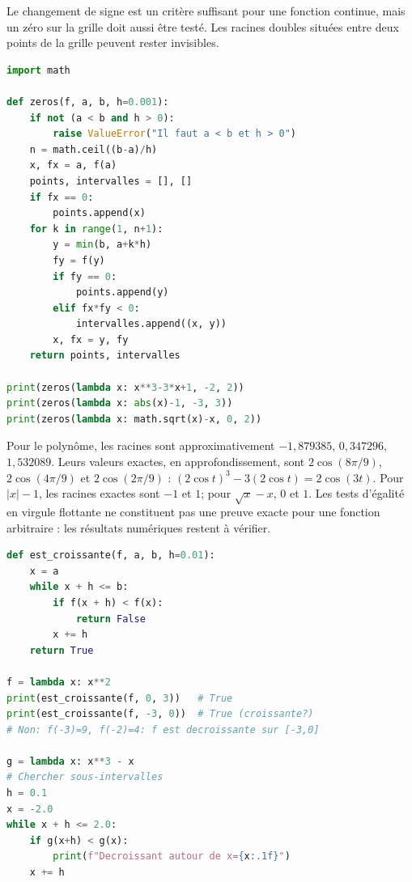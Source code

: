 Le changement de signe est un crit\`ere suffisant pour une fonction continue,
mais un z\'ero sur la grille doit aussi \^etre test\'e. Les racines doubles
situ\'ees entre deux points de la grille peuvent rester invisibles.
\begin{lstlisting}[language=Python]
import math

def zeros(f, a, b, h=0.001):
    if not (a < b and h > 0):
        raise ValueError("Il faut a < b et h > 0")
    n = math.ceil((b-a)/h)
    x, fx = a, f(a)
    points, intervalles = [], []
    if fx == 0:
        points.append(x)
    for k in range(1, n+1):
        y = min(b, a+k*h)
        fy = f(y)
        if fy == 0:
            points.append(y)
        elif fx*fy < 0:
            intervalles.append((x, y))
        x, fx = y, fy
    return points, intervalles

print(zeros(lambda x: x**3-3*x+1, -2, 2))
print(zeros(lambda x: abs(x)-1, -3, 3))
print(zeros(lambda x: math.sqrt(x)-x, 0, 2))
\end{lstlisting}
Pour le polyn\^ome, les racines sont approximativement
$-1{,}879385$, $0{,}347296$, $1{,}532089$.
Leurs valeurs exactes, en approfondissement, sont
$2\cos(8\pi/9)$, $2\cos(4\pi/9)$ et $2\cos(2\pi/9)$ :
$(2\cos t)^3-3(2\cos t)=2\cos(3t)$.
Pour $|x|-1$, les racines exactes sont $-1$ et $1$; pour $\sqrt x-x$, $0$ et $1$.
Les tests d'\'egalit\'e en virgule flottante ne constituent pas une preuve
exacte pour une fonction arbitraire : les r\'esultats num\'eriques restent \`a v\'erifier.


\begin{lstlisting}[language=Python]
def est_croissante(f, a, b, h=0.01):
    x = a
    while x + h <= b:
        if f(x + h) < f(x):
            return False
        x += h
    return True

f = lambda x: x**2
print(est_croissante(f, 0, 3))   # True
print(est_croissante(f, -3, 0))  # True (croissante?)
# Non: f(-3)=9, f(-2)=4: f est decroissante sur [-3,0]

g = lambda x: x**3 - x
# Chercher sous-intervalles
h = 0.1
x = -2.0
while x + h <= 2.0:
    if g(x+h) < g(x):
        print(f"Decroissant autour de x={x:.1f}")
    x += h
\end{lstlisting}


